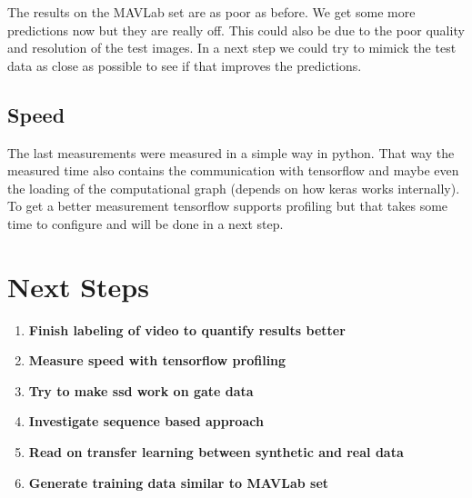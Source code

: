 \documentclass{article}
\begin{document}
The results on the MAVLab set are as poor as before. We get some more predictions now but they are really off. This could also be due to the poor quality and resolution of the test images. In a next step we could try to mimick the test data as close as possible to see if that improves the predictions.


\subsection{Speed}

The last measurements were measured in a simple way in python. That way the measured time also contains the communication with tensorflow and maybe even the loading of the computational graph (depends on how keras works internally). To get a better measurement tensorflow supports profiling but that takes some time to configure and will be done in a next step.

\section{Next Steps}
\begin{enumerate}
		\item \textbf{Finish labeling of video to quantify results better}
		\item \textbf{Measure speed with tensorflow profiling}
		\item \textbf{Try to make ssd work on gate data}
		\item \textbf{Investigate sequence based approach}
		\item \textbf{Read on transfer learning between synthetic and real data}
		\item \textbf{Generate training data similar to MAVLab set}
\end{enumerate}









\end{document}
